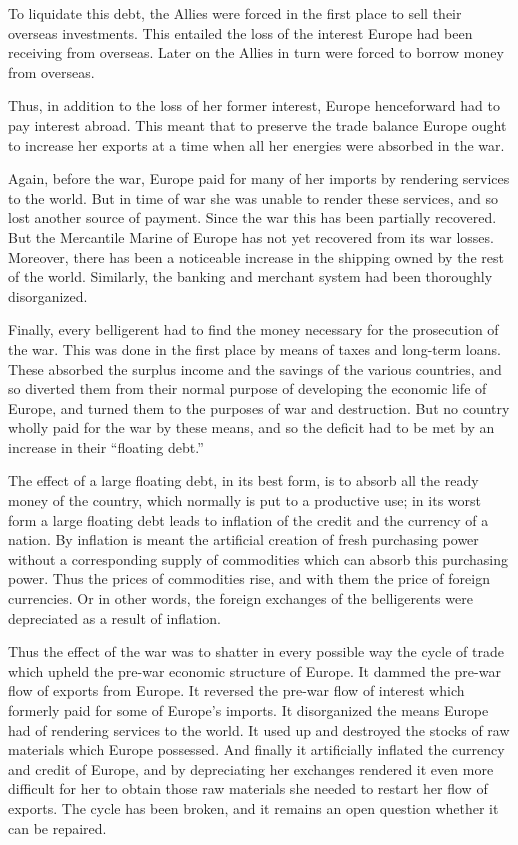 \documentclass{book}
\begin{document}
To liquidate this debt, the Allies were forced in the first place to sell their overseas investments. This entailed the loss of the interest Europe had been receiving from overseas. Later on the Allies in turn were forced to borrow money from overseas.

Thus, in addition to the loss of her former interest, Europe henceforward had to pay interest abroad. This meant that to preserve the trade balance Europe ought to increase her exports at a time when all her energies were absorbed in the war.

Again, before the war, Europe paid for many of her imports by rendering services to the world. But in time of war she was unable to render these services, and so lost another source of payment. Since the war this has been partially recovered. But the Mercantile Marine of Europe has not yet recovered from its war losses. Moreover, there has been a noticeable increase in the shipping owned by the rest of the world. Similarly, the banking and merchant system had been thoroughly disorganized.

Finally, every belligerent had to find the money necessary for the prosecution of the war. This was done in the first place by means of taxes and long-term loans. These absorbed the surplus income and the savings of the various countries, and so diverted them from their normal purpose of developing the economic life of Europe, and turned them to the purposes of war and destruction. But no country wholly paid for the war by these means, and so the deficit had to be met by an increase in their “floating debt.”

The effect of a large floating debt, in its best form, is to absorb all the ready money of the country, which normally is put to a productive use; in its worst form a large floating debt leads to inflation of the credit and the currency of a nation. By inflation is meant the artificial creation of fresh purchasing power without a corresponding supply of commodities which can absorb this purchasing power. Thus the prices of commodities rise, and with them the price of foreign currencies. Or in other words, the foreign exchanges of the belligerents were depreciated as a result of inflation.

Thus the effect of the war was to shatter in every possible way the cycle of trade which upheld the pre-war economic structure of Europe. It dammed the pre-war flow of exports from Europe. It reversed the pre-war flow of interest which formerly paid for some of Europe’s imports. It disorganized the means Europe had of rendering services to the world. It used up and destroyed the stocks of raw materials which Europe possessed. And finally it artificially inflated the currency and credit of Europe, and by depreciating her exchanges rendered it even more difficult for her to obtain those raw materials she needed to restart her flow of exports. The cycle has been broken, and it remains an open question whether it can be repaired.
\end{document}
